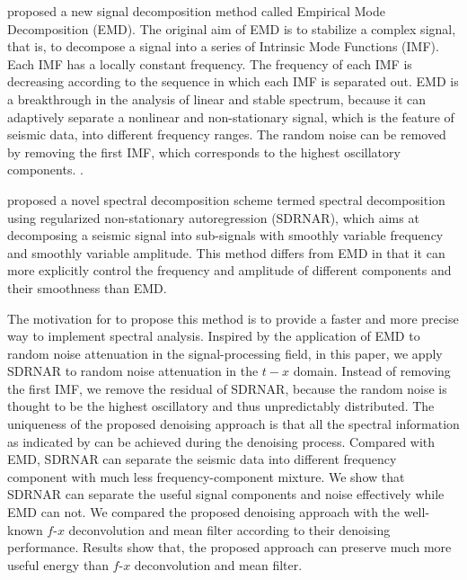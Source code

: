 \cite{emd} proposed a new signal decomposition method called Empirical Mode Decomposition (EMD). The original aim of EMD is to stabilize a complex signal, that is, to decompose a signal into a series of Intrinsic Mode Functions (IMF). Each IMF has a locally constant frequency. The frequency of each IMF is decreasing according to the sequence in which each IMF is separated out. EMD is a breakthrough in the analysis of linear and stable spectrum, because it can adaptively separate a nonlinear and non-stationary signal, which is the feature of seismic data, into different frequency ranges. The random noise can be removed by removing the first IMF, which corresponds to the highest oscillatory components. .

\cite{sdrnar} proposed a novel spectral decomposition scheme termed spectral decomposition using regularized non-stationary autoregression (SDRNAR), which aims at decomposing a seismic signal into sub-signals with smoothly variable frequency and smoothly variable amplitude. This method differs from EMD in that it can more explicitly control the frequency and amplitude of different components and their smoothness than EMD. 

The motivation for \cite{sdrnar} to propose this method is to provide a faster and more precise way to implement spectral analysis. Inspired by the application of EMD to random noise attenuation in the signal-processing field, in this paper, we apply SDRNAR to random noise attenuation in the $t-x$ domain. Instead of removing the first IMF, we remove the residual of SDRNAR, because the random noise is thought to be the highest oscillatory and thus unpredictably distributed.  The uniqueness of the proposed denoising approach is that all the spectral information as indicated by \cite{sdrnar} can be achieved during the denoising process. Compared with EMD, SDRNAR can separate the seismic data into different frequency component with much less frequency-component mixture. We show that SDRNAR can separate the useful signal components and noise effectively while EMD can not. We compared the proposed denoising approach with the well-known $f$-$x$ deconvolution and mean filter according to their denoising performance. Results show that, the proposed approach can preserve much more useful energy than $f$-$x$ deconvolution and mean filter. 

